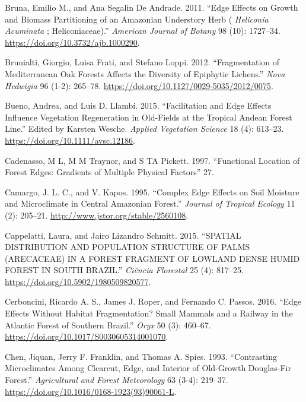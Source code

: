 \documentclass[
  12pt,
]{article}
\newlength{\cslhangindent}
\newenvironment{CSLReferences}[2] %
 {\begin{list}{}{%
  \setlength{\itemindent}{0pt}
  \setlength{\leftmargin}{0pt}
  \setlength{\parsep}{0pt}
  \ifodd #1
   \setlength{\leftmargin}{\cslhangindent}
   \setlength{\itemindent}{-1\cslhangindent}
  \fi
  \setlength{\itemsep}{#2\baselineskip}}}
 {\end{list}}
\begin{document}
\begin{CSLReferences}{1}{0}
Bruna, Emilio M., and Ana Segalin De Andrade. 2011. {``Edge Effects on
Growth and Biomass Partitioning of an {Amazonian} Understory Herb (
\emph{{Heliconia} Acuminata} ; {Heliconiaceae}).''} \emph{American
Journal of Botany} 98 (10): 1727--34.
\url{https://doi.org/10.3732/ajb.1000290}.

Brunialti, Giorgio, Luisa Frati, and Stefano Loppi. 2012.
{``Fragmentation of {Mediterranean} Oak Forests Affects the Diversity of
Epiphytic Lichens.''} \emph{Nova Hedwigia} 96 (1-2): 265--78.
\url{https://doi.org/10.1127/0029-5035/2012/0075}.

Bueno, Andrea, and Luis D. Llambí. 2015. {``Facilitation and Edge
Effects Influence Vegetation Regeneration in Old-Fields at the Tropical
{Andean} Forest Line.''} Edited by Karsten Wesche. \emph{Applied
Vegetation Science} 18 (4): 613--23.
\url{https://doi.org/10.1111/avsc.12186}.

Cadenasso, M L, M M Traynor, and S TA Pickett. 1997. {``Functional
Location of Forest Edges: Gradients of Multiple Physical Factors''} 27.

Camargo, J. L. C., and V. Kapos. 1995. {``Complex {Edge} {Effects} on
{Soil} {Moisture} and {Microclimate} in {Central} {Amazonian}
{Forest}.''} \emph{Journal of Tropical Ecology} 11 (2): 205--21.
\url{http://www.jstor.org/stable/2560108}.

Cappelatti, Laura, and Jairo Lizandro Schmitt. 2015. {``{SPATIAL}
{DISTRIBUTION} {AND} {POPULATION} {STRUCTURE} {OF} {PALMS} ({ARECACEAE})
{IN} {A} {FOREST} {FRAGMENT} {OF} {LOWLAND} {DENSE} {HUMID} {FOREST}
{IN} {SOUTH} {BRAZIL}.''} \emph{Ciência Florestal} 25 (4): 817--25.
\url{https://doi.org/10.5902/1980509820577}.

Cerboncini, Ricardo A. S., James J. Roper, and Fernando C. Passos. 2016.
{``Edge Effects Without Habitat Fragmentation? {Small} Mammals and a
Railway in the {Atlantic} {Forest} of Southern {Brazil}.''} \emph{Oryx}
50 (3): 460--67. \url{https://doi.org/10.1017/S0030605314001070}.

Chen, Jiquan, Jerry F. Franklin, and Thomas A. Spies. 1993.
{``Contrasting Microclimates Among Clearcut, Edge, and Interior of
Old-Growth {Douglas}-Fir Forest.''} \emph{Agricultural and Forest
Meteorology} 63 (3-4): 219--37.
\url{https://doi.org/10.1016/0168-1923(93)90061-L}.


\end{CSLReferences}
\end{document}

